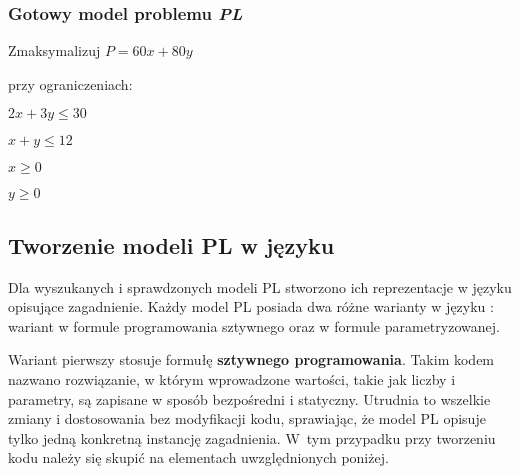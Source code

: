 \subsubsection*{Gotowy model problemu \textit{PL}}
    Zmaksymalizuj $P = 60x + 80y$

przy ograniczeniach:

    $2x + 3y \leq 30$
    
    $x + y \leq 12$
    
    $x  \geq 0$
    
    $y \geq 0$


\subsection{Tworzenie modeli PL w języku }

Dla wyszukanych i sprawdzonych modeli PL stworzono ich reprezentacje w języku  opisujące zagadnienie. %
Każdy model PL posiada dwa różne warianty w języku  : wariant w formule programowania sztywnego oraz w formule parametryzowanej. %

Wariant pierwszy stosuje formułę \textbf{sztywnego programowania}. Takim kodem nazwano rozwiązanie, w którym wprowadzone wartości, takie jak liczby i parametry, są zapisane w sposób bezpośredni i statyczny. Utrudnia to wszelkie zmiany i dostosowania bez modyfikacji kodu, sprawiając, że model PL opisuje tylko jedną konkretną instancję zagadnienia. W~tym przypadku przy tworzeniu kodu   należy się skupić na elementach uwzględnionych poniżej.

